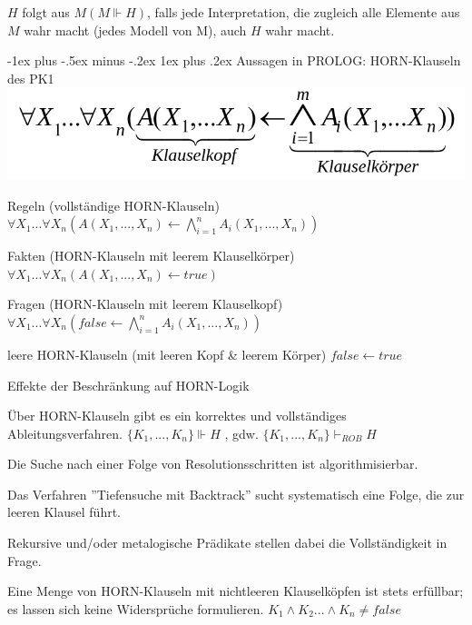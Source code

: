 \documentclass[a4paper]{article}
\makeatletter
\renewcommand{\subsubsection}{\@startsection{subsubsection}{3}{0mm}%
                {-1ex plus -.5ex minus -.2ex}%
                {1ex plus .2ex}%
                {\normalfont\small\bfseries}}
\makeatother
\begin{document}
\begin{multicols}{3}
  $H$ folgt aus $M(M \Vdash H)$, falls jede Interpretation, die zugleich alle Elemente aus $M$ wahr macht (jedes Modell von M), auch $H$ wahr macht.

  \subsubsection{Aussagen in PROLOG: HORN-Klauseln des PK1}
  \includegraphics[width=.5\linewidth]{Assets/Logik-prolog-horn.png}

  \begin{enumerate*}
    \item Regeln (vollständige HORN-Klauseln)        $\forall X_1... \forall X_n(A(X_1,...,X_n)\leftarrow \bigwedge_{i=1}^n A_i(X_1,...,X_n))$
    \item Fakten (HORN-Klauseln mit leerem Klauselkörper)        $\forall X_1...\forall X_n(A(X_1,...,X_n)\leftarrow true)$
    \item Fragen (HORN-Klauseln mit leerem Klauselkopf)        $\forall X_1...\forall X_n(false \leftarrow \bigwedge_{i=1}^n A_i(X_1,...,X_n))$
    \item leere HORN-Klauseln (mit leeren Kopf \& leerem Körper)        $false\leftarrow true$
  \end{enumerate*}

  Effekte der Beschränkung auf HORN-Logik
  \begin{enumerate*}
    \item Über HORN-Klauseln gibt es ein korrektes und vollständiges Ableitungsverfahren. $\{K_1, ...,K_n\} \Vdash H$ , gdw. $\{K_1,...,K_n\} \vdash_{ROB} H$
    \item Die Suche nach einer Folge von Resolutionsschritten ist algorithmisierbar.
    \begin{itemize*}
      \item Das Verfahren ''Tiefensuche mit Backtrack'' sucht systematisch eine Folge, die zur leeren Klausel führt.
      \item Rekursive und/oder metalogische Prädikate stellen dabei die Vollständigkeit in Frage.
    \end{itemize*}
    \item Eine Menge von HORN-Klauseln mit nichtleeren Klauselköpfen ist stets erfüllbar; es lassen sich keine Widersprüche formulieren. $K_1 \wedge K_2...\wedge K_n \not= false$
  \end{enumerate*}


\end{multicols}
\end{document}
